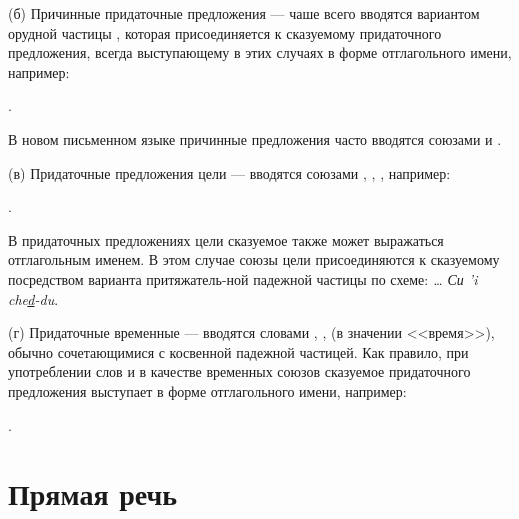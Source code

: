 (б)	Причинные придаточные предложения --- чаше всего вводятся вариантом орудной частицы , которая присоединяется к сказуемому придаточного предложения, всегда выступающему в этих случаях в форме отглагольного имени, например:
\begin{prfsample}
	\item {}.
\end{prfsample}

В новом письменном языке причинные предложения часто вводятся союзами  и .

(в)	Придаточные предложения цели --- вводятся союзами , , , например:
\begin{prfsample}
	\item {}.
\end{prfsample}
В придаточных предложениях цели сказуемое также может выражаться отглагольным именем. В этом случае союзы цели присоединяются к сказуемому посредством варианта притяжатель-ной падежной частицы  по схеме: \emph{\ldots{} Си 'i che\ul{d}-du}.

(г)	Придаточные временные --- вводятся словами
, ,  (в значении <<время>>), обычно сочетающимися с косвенной падежной частицей. Как правило, при употреблении слов  и  в качестве временных союзов сказуемое придаточного предложения выступает в форме отглагольного имени, например:
\begin{prfsample}
	\item {}.
\end{prfsample}

\section{Прямая речь}

